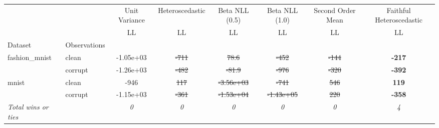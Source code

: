 \begin{tabular}{ll|c|c|c|c|c|c}
\toprule
{} & {} & {Unit Variance} & {Heteroscedastic} & {Beta NLL (0.5)} & {Beta NLL (1.0)} & {Second Order Mean} & {Faithful Heteroscedastic} \\
{} & {} & {LL} & {LL} & {LL} & {LL} & {LL} & {LL} \\
{Dataset} & {Observations} & {} & {} & {} & {} & {} & {} \\
\midrule
\multirow[t]{2}{*}{fashion_mnist} & clean & -1.05e+03 & \sout{-711} & \sout{78.6} & \sout{-452} & \sout{-144} & \textbf{-217} \\
 & corrupt & -1.26e+03 & \sout{-482} & \sout{-81.9} & \sout{-976} & \sout{-320} & \textbf{-392} \\
\multirow[t]{2}{*}{mnist} & clean & -946 & \sout{117} & \sout{-3.56e+03} & \sout{-741} & \sout{546} & \textbf{119} \\
 & corrupt & -1.15e+03 & \sout{-361} & \sout{-1.53e+04} & \sout{-1.43e+05} & \sout{220} & \textbf{-358} \\
\textit{{Total wins or ties}} &  & \textit{0} & \textit{0} & \textit{0} & \textit{0} & \textit{0} & \textit{4} \\
\bottomrule
\end{tabular}
